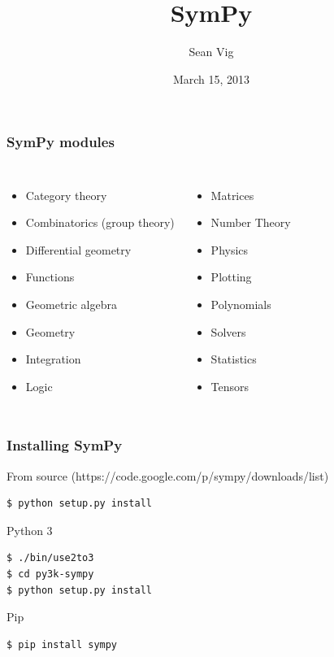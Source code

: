 \documentclass{beamer}
\title{SymPy}
\author{Sean Vig}
\date{March 15, 2013}
\begin{document}
\maketitle
\begin{frame}
  \frametitle{SymPy modules}
  \begin{columns}[l]
    \begin{itemize}
      \item Category theory
      \item Combinatorics (group theory)
      \item Differential geometry
      \item Functions
      \item Geometric algebra
      \item Geometry
      \item Integration
      \item Logic
    \end{itemize}
    \begin{itemize}
      \item Matrices
      \item Number Theory
      \item Physics
      \item Plotting
      \item Polynomials
      \item Solvers
      \item Statistics
      \item Tensors
    \end{itemize}
  \end{columns}
\end{frame}

\begin{frame}[fragile]
  \frametitle{Installing SymPy}
  From source (https://code.google.com/p/sympy/downloads/list)
  \begin{exampleblock}{}
    \begin{verbatim}$ python setup.py install\end{verbatim}
  \end{exampleblock}
  Python 3
  \begin{exampleblock}{}
    \begin{verbatim}$ ./bin/use2to3
$ cd py3k-sympy
$ python setup.py install\end{verbatim}
  \end{exampleblock}
  Pip
  \begin{exampleblock}{}
    \begin{verbatim}$ pip install sympy\end{verbatim}
  \end{exampleblock}
\end{frame}
\end{document}
